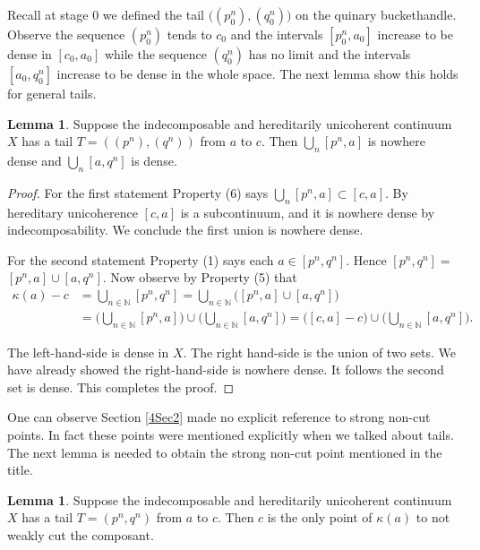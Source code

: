\documentclass[12pt]{article}
\theoremstyle{plain}
\theoremstyle{definition}
\newcounter{dummy}
\newtheorem{lmma}[dummy]{Lemma}
\newcounter{dummy4}
\newcounter{dummy3}
\newcounter{dummy5}
\newcounter{dummy6}
\newcommand{\K}{\ensuremath{\kappa}}
\newcommand{\NN}{\ensuremath{\mathbb N}}
\newcommand{\0}{\ensuremath{\varnothing}}
\begin{document}
	Recall at stage $0$ we defined the tail $\big ( (p^n_0) , (q^n_0) \big )$ on the quinary buckethandle. Observe the sequence $(p^n_0)$ tends to $c_0$ and the intervals $[p^n_0, a_0]$ increase to be dense in $[c_0, a_0]$ while the sequence $(q^n_0)$ has no limit and the intervals $[a_0, q^n_0]$ increase to be dense in the whole space. The next lemma show this holds for general tails.
	
	\begin{lmma}\label{tailends}
		Suppose the indecomposable and hereditarily unicoherent continuum $X$ has a tail $T = ((p^n),(q^n))$ from $a$ to $c$.
		Then $\bigcup_n [p^n,a]$ is nowhere dense and $\bigcup_n [a,q^n]$ is dense.
	\end{lmma}
	
	\begin{proof}
		For the first statement Property (6) says $\bigcup_n [p^n,a] \subset [c,a]$.
		By hereditary unicoherence $[c,a]$ is a subcontinuum, and it is nowhere dense by indecomposability. 
		We conclude the first union is nowhere dense. 
		
		For the second statement Property (1) says each $a \in [p^n,q^n]$. Hence $[p^n,q^n] = $
		\mbox{$[p^n,a] \cup [a,q^n]$}.
		Now observe by Property (5) that
		\begin{align*}
			\displaystyle \K(a) -c &= \bigcup _{n \in \NN} [p^n,q^n] = \bigcup_{n \in \NN}  \Big ( [p^n,a] \cup [a,q^n] \Big )\\ 
			&= \Big (\bigcup_{n \in \NN}  [p^n,a]  \Big ) \cup \Big ( \bigcup_{n \in \NN}  [a,q^n] \Big ) 
			= \Big ([c,a] - c \Big ) \cup \Big ( \bigcup_{n \in \NN}  [a,q^n] \Big ). 
		\end{align*}
		
		The left-hand-side is dense in $X$. The right hand-side is the union of two sets. We have already showed the right-hand-side is nowhere dense. It follows the second set is dense. This completes the proof.
	\end{proof}
	
	One can observe Section \ref{4Sec2} made no explicit reference to strong non-cut points. In fact these points were mentioned explicitly when we talked about tails. The next lemma is needed to obtain the strong non-cut point mentioned in the title. 
	
	\begin{lmma} \label{tailwcp}
		Suppose the indecomposable and hereditarily unicoherent continuum $X$ has a tail $T = (p^n,q^n)$ from $a$ to $c$. 
		Then $c$ is the only point of $\K(a)$ to not weakly cut the composant. 
	\end{lmma}
	
\end{document}
